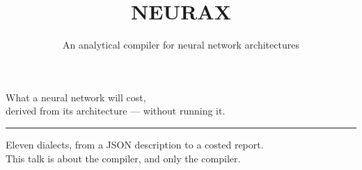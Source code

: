 \documentclass[aspectratio=169,11pt]{beamer}
\title{\textbf{NEURAX}}
\subtitle{An analytical compiler for neural network architectures}
\date{}
\begin{document}
\begin{frame}[plain]
  \vspace{1.1cm}

  \vspace{0.9cm}
  {\large\color{nxSlate}What a neural network will cost,\\[2pt]
   derived from its architecture --- without running it.}

  \vspace{1.0cm}
  \textcolor{nxRule}{\rule{0.42\linewidth}{0.8pt}}

  \vspace{0.4cm}
  {\footnotesize\color{nxMute}
   Eleven dialects, from a JSON description to a costed report.\\
   This talk is about the compiler, and only the compiler.}
\end{frame}
\end{document}
